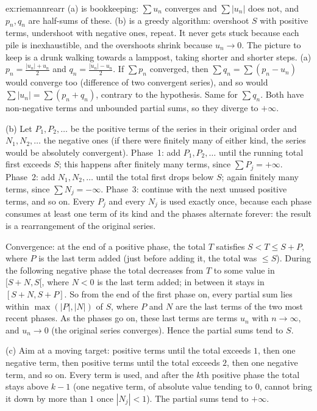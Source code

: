 \begin{solution}{ex:riemannrearr}
\idea (a) is bookkeeping: $\sum u_n$ converges and $\sum|u_n|$ does not, and $p_n,q_n$ are half-sums of these. (b) is a greedy algorithm: overshoot $S$ with positive terms, undershoot with negative ones, repeat. It never gets stuck because each pile is inexhaustible, and the overshoots shrink because $u_n\to0$. The picture to keep is a drunk walking towards a lamppost, taking shorter and shorter steps.
\writeup (a) $p_n=\frac{|u_n|+u_n}2$ and $q_n=\frac{|u_n|-u_n}2$. If $\sum p_n$ converged, then $\sum q_n=\sum(p_n-u_n)$ would converge too (difference of two convergent series), and so would $\sum|u_n|=\sum(p_n+q_n)$, contrary to the hypothesis. Same for $\sum q_n$. Both have non-negative terms and unbounded partial sums, so they diverge to $+\infty$.

(b) Let $P_1,P_2,\dots$ be the positive terms of the series in their original order and $N_1,N_2,\dots$ the negative ones (if there were finitely many of either kind, the series would be absolutely convergent). Phase~1: add $P_1,P_2,\dots$ until the running total first exceeds $S$; this happens after finitely many terms, since $\sum P_j=+\infty$. Phase~2: add $N_1,N_2,\dots$ until the total first drops below $S$; again finitely many terms, since $\sum N_j=-\infty$. Phase~3: continue with the next unused positive terms, and so on. Every $P_j$ and every $N_j$ is used exactly once, because each phase consumes at least one term of its kind and the phases alternate forever: the result is a rearrangement of the original series.

Convergence: at the end of a positive phase, the total $T$ satisfies $S<T\le S+P$, where $P$ is the last term added (just before adding it, the total was $\le S$). During the following negative phase the total decreases from $T$ to some value in $[S+N,S[$, where $N<0$ is the last term added; in between it stays in $[S+N,S+P]$. So from the end of the first phase on, every partial sum lies within $\max(|P|,|N|)$ of $S$, where $P$ and $N$ are the last terms of the two most recent phases. As the phases go on, these last terms are terms $u_n$ with $n\to\infty$, and $u_n\to0$ (the original series converges). Hence the partial sums tend to $S$.

(c) Aim at a moving target: positive terms until the total exceeds $1$, then one negative term, then positive terms until the total exceeds $2$, then one negative term, and so on. Every term is used, and after the $k$th positive phase the total stays above $k-1$ (one negative term, of absolute value tending to $0$, cannot bring it down by more than $1$ once $|N_j|<1$). The partial sums tend to $+\infty$.
\end{solution}

